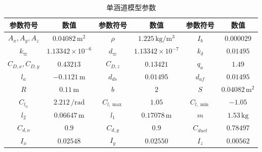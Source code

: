 \begin{table}
\caption{\label{DF_para}单涵道模型参数}
	\centering{}%
	\small 
	\begin{tabular}{cccccc}
		\hline 
		参数符号 & 数值&参数符号 & 数值&参数符号 & 数值\tabularnewline
		\hline 
		$ A_x,A_y,A_z $  & $ 0.04082\,\text{m}^2 $ &$ \rho $        &$1.225\,\text{kg}/\text{m}^3$&$ I_b $           & $ 0.000029 $               \tabularnewline
		$ k_{\varpi} $   & $1.13342 \times 10^{-6}$& $ d_{\varpi} $ & $1.13342 \times 10^{-7}$ 	  &$k_{\delta} $     & $ 0.01495 $ 			      \tabularnewline
		$C_{D,x},C_{D,y}$& $ 0.43213 $             &$ C_{D,z} $     & $ 0.13421 $             	  &	$ q_a $ 	     & $ 1.49 $ 				  \tabularnewline
	    $ l_{a} $        & $ -0.1121\,\text{m} $   & $ d_{ds} $     & $ 0.01495 $			  	  &$ d_{af} $        & $ 0.01495 $    			  \tabularnewline
		$ R $            & $ 0.11\,\text{m} $      &$ b $           & $ 2 $       			   	  &$ S $ 			 & $ 0.04082\,\text{m}^2 $    \tabularnewline
		$C_{l_{\alpha}}$ & $ 2.212\,/\text{rad} $  &$C_{l, \max } $ & $ 1.05 $ 				   	  &$ C_{l, \min } $  & $ -1.05 $ 				  \tabularnewline
		$ l_2 $          & $ 0.06647\,\text{m} $   &$ l_1 $         & $ 0.17078\,\text{m} $    	  &	$ m $ 		     & $ 1.53\,\text{kg} $ 		  \tabularnewline
		$ C_{d, o } $    & $ 0.9 $                 &$ C_{d, g } $   & $ 0.9 $					  &$ C_{duct} $      & $ 0.78497 $	 			  \tabularnewline
		$ I_x $          & $ 0.02548 $ 			   &$ I_y $         & $ 0.02550 $                 &$ I_z $			 & $ 0.00562 $ 				  \tabularnewline
		\hline 
	\end{tabular}	
\end{table}


